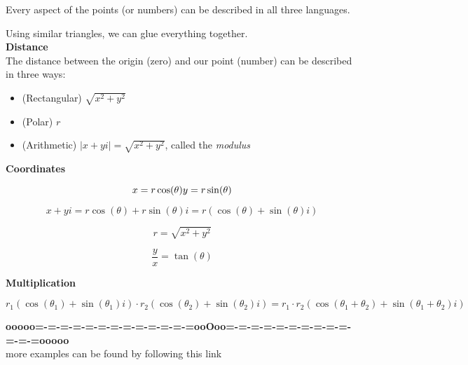 \documentclass{ximera}
\begin{document}
Every aspect of the points (or numbers) can be described in all three languages.  


\qquad



Using similar triangles, we can glue everything together.  \\




\textbf{\textcolor{blue!55!black}{Distance}}  \\


The distance between the origin (zero) and our point (number) can be described in three ways:


\begin{itemize}
\item (Rectangular)  $\sqrt{x^2 + y^2}$
\item (Polar) $r$
\item (Arithmetic) $|x + y i  | = \sqrt{x^2 + y^2}$, called the \textit{modulus}
\end{itemize}



\qquad


\textbf{\textcolor{blue!55!black}{Coordinates}} 


\[
x = r \cos(\theta)  \\
y = r \sin(\theta)
\]


\[
x + y i = r \cos(\theta) + r \sin(\theta) i = r (\cos(\theta) +  \sin(\theta) i)
\]




\[
r = \sqrt{x^2 + y^2}
\]


\[
\frac{y}{x} = \tan(\theta)
\]





\qquad


\textbf{\textcolor{blue!55!black}{Multiplication}} 


\[
r_1 (\cos(\theta_1) +  \sin(\theta_1) i) \cdot r_2 (\cos(\theta_2) +  \sin(\theta_2) i) = r_1 \cdot r_2 (\cos(\theta_1 + \theta_2) +  \sin(\theta_1 + \theta_2) i) 
\]












\begin{center}
\textbf{\textcolor{green!50!black}{ooooo=-=-=-=-=-=-=-=-=-=-=-=-=ooOoo=-=-=-=-=-=-=-=-=-=-=-=-=ooooo}} \\

more examples can be found by following this link\\ 

\end{center}
\end{document}
